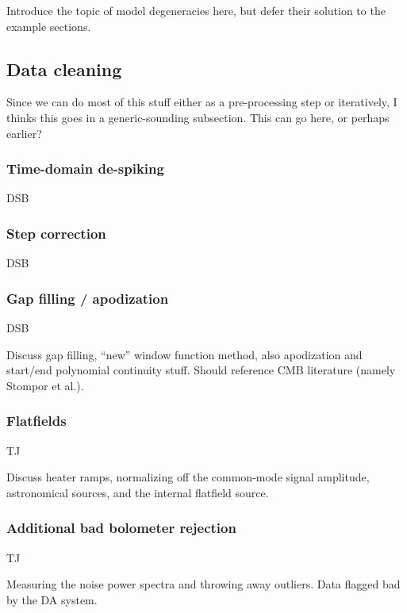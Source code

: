 \documentclass[useAMS,usenatbib,nofootinbib]{mn2e}
\begin{document}
Introduce the topic of model degeneracies here, but defer their
solution to the example sections.

\subsection{Data cleaning}

Since we can do most of this stuff either as a pre-processing step or
iteratively, I thinks this goes in a generic-sounding subsection. This
can go here, or perhaps earlier?

\subsubsection{Time-domain de-spiking}

DSB

\subsubsection{Step correction}

DSB

\subsubsection{Gap filling / apodization}

DSB

Discuss gap filling, ``new'' window function method, also apodization
and start/end polynomial continuity stuff. Should reference CMB
literature (namely Stompor et al.).

\subsubsection{Flatfields}
\label{sec:flatfields}

TJ

Discuss heater ramps, normalizing off the common-mode signal
amplitude, astronomical sources, and the internal flatfield source.

\subsubsection{Additional bad bolometer rejection}

TJ

Measuring the noise power spectra and throwing away outliers. Data
flagged bad by the DA system.
\end{document}

